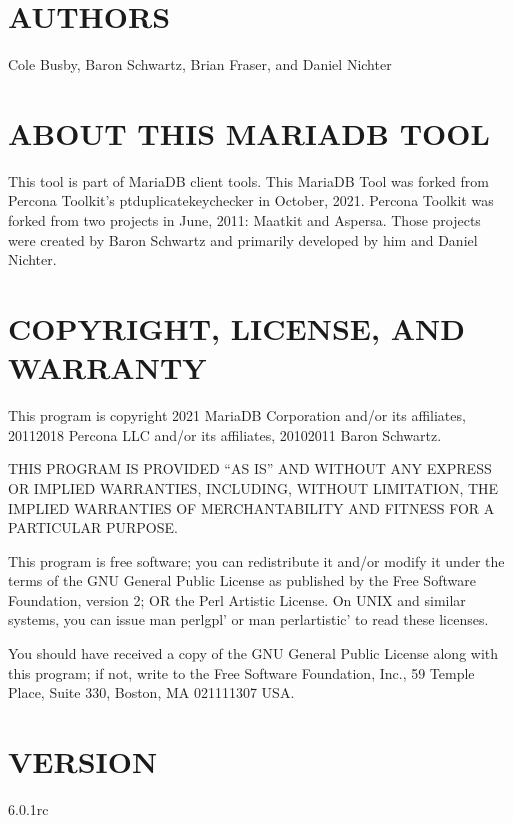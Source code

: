 \documentclass[letterpaper,10pt,english]{sphinxmanual}
\begin{document}
\section{AUTHORS}
\label{\detokenize{mariadb-index-checker:authors}}
\sphinxAtStartPar
Cole Busby, Baron Schwartz, Brian Fraser, and Daniel Nichter


\section{ABOUT THIS MARIADB TOOL}
\label{\detokenize{mariadb-index-checker:about-this-mariadb-tool}}
\sphinxAtStartPar
This tool is part of MariaDB client tools. This MariaDB Tool was forked from
Percona Toolkit’s pt\sphinxhyphen{}duplicate\sphinxhyphen{}key\sphinxhyphen{}checker in October, 2021. Percona Toolkit
was forked from two projects in June, 2011: Maatkit and Aspersa.
Those projects were created by Baron Schwartz and primarily developed by him
and Daniel Nichter.


\section{COPYRIGHT, LICENSE, AND WARRANTY}
\label{\detokenize{mariadb-index-checker:copyright-license-and-warranty}}
\sphinxAtStartPar
This program is copyright 2021 MariaDB Corporation and/or its affiliates,
2011\sphinxhyphen{}2018 Percona LLC and/or its affiliates, 2010\sphinxhyphen{}2011 Baron Schwartz.

\sphinxAtStartPar
THIS PROGRAM IS PROVIDED “AS IS” AND WITHOUT ANY EXPRESS OR IMPLIED
WARRANTIES, INCLUDING, WITHOUT LIMITATION, THE IMPLIED WARRANTIES OF
MERCHANTABILITY AND FITNESS FOR A PARTICULAR PURPOSE.

\sphinxAtStartPar
This program is free software; you can redistribute it and/or modify it under
the terms of the GNU General Public License as published by the Free Software
Foundation, version 2; OR the Perl Artistic License.  On UNIX and similar
systems, you can issue \textasciigrave{}man perlgpl’ or \textasciigrave{}man perlartistic’ to read these
licenses.

\sphinxAtStartPar
You should have received a copy of the GNU General Public License along with
this program; if not, write to the Free Software Foundation, Inc., 59 Temple
Place, Suite 330, Boston, MA  02111\sphinxhyphen{}1307  USA.


\section{VERSION}
\label{\detokenize{mariadb-index-checker:version}}
\sphinxAtStartPar
{} 6.0.1rc
\end{document}
